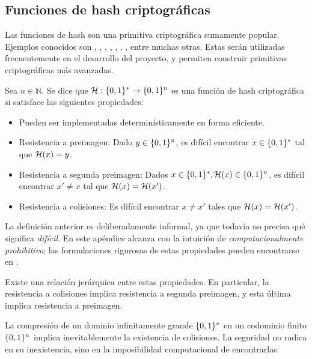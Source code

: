 
\subsection{Funciones de hash criptográficas}
\label{subsec:apendice-a-hashes-funciones-de-hash-criptograficas}

Las funciones de hash son una primitiva criptográfica sumamente popular. Ejemplos conocidos son \MDFive, \SHAOne, \SHATwoFiveSix, \BLAKETwo, \BLAKEThree, \RIPEMD, \PoseidonHash, entre muchas otras. Estas serán utilizadas frecuentemente en el desarrollo del proyecto, y permiten construir primitivas criptográficas más avanzadas.

\begin{definition}
\label{def:apendice-a-hashes-funcion-de-hash-criptografica}
	Sea $n \in \mathbb{N}$. Se dice que $\mathcal{H}: \{0,1\}^{*} \to \{0,1\}^{n}$ es una función de hash criptográfica si satisface las siguientes propiedades:
	\begin{itemize}[noitemsep]
		\item Pueden ser implementadas determinísticamente en forma eficiente.
		\item Resistencia a preimagen: Dado $y \in \{0,1\}^{n}$, es difícil encontrar $x \in \{0,1\}^{*}$ tal que $\mathcal{H}(x) = y$.
		\item Resistencia a segunda preimagen: Dados $x \in \{0,1\}^{*}, \mathcal{H}(x) \in \{0,1\}^{n}$, es difícil encontrar $x' \neq x$ tal que $\mathcal{H}(x) = \mathcal{H}(x')$.
		\item Resistencia a colisiones: Es difícil encontrar $x \neq x'$ tales que $\mathcal{H}(x) = \mathcal{H}(x')$.
	\end{itemize}
\end{definition}

La definición anterior es deliberadamente informal, ya que todavía no precisa qué significa \textit{difícil}. En este apéndice alcanza con la intuición de \textit{computacionalmente prohibitivo}; las formulaciones rigurosas de estas propiedades pueden encontrarse en \cite{hac,katz}.

Existe una relación jerárquica entre estas propiedades. En particular, la resistencia a colisiones implica resistencia a segunda preimagen, y esta última implica resistencia a preimagen.

La compresión de un dominio infinitamente grande $\{0,1\}^{*}$ en un codominio finito $\{0,1\}^{n}$ implica inevitablemente la existencia de colisiones. La seguridad no radica en su inexistencia, sino en la imposibilidad computacional de encontrarlas.

